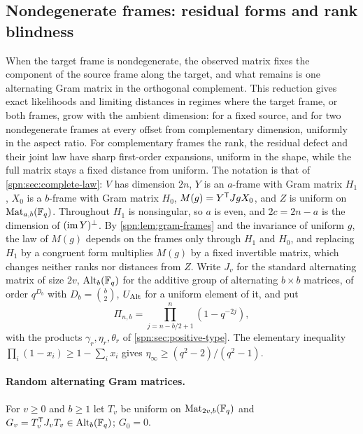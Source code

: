 
\subsection{Nondegenerate frames: residual forms and rank blindness}\label{spn:sec:nondegenerate}

When the target frame is nondegenerate, the observed matrix fixes the component of the source
frame along the target, and what remains is one alternating Gram matrix in the orthogonal
complement. This reduction gives exact likelihoods and limiting distances in regimes where the
target frame, or both frames, grow with the ambient dimension: for a fixed source, and for two
nondegenerate frames at every offset from complementary dimension, uniformly in the aspect
ratio. For complementary frames the rank, the residual defect and their joint law have sharp
first-order expansions, uniform in the shape, while the full matrix stays a fixed distance from
uniform. The notation is that of
\cref{spn:sec:complete-law}: $V$ has dimension $2n$, $Y$ is an $a$-frame with Gram matrix $H_1$,
$X_0$ is a $b$-frame with Gram matrix $H_0$, $M(g)=Y^{\mathsf{T}}JgX_0$, and $Z$ is uniform on
$\operatorname{Mat}_{a,b}(\mathbb{F}_q)$. Throughout $H_1$ is nonsingular, so $a$ is even, and $2c=2n-a$ is the
dimension of $(\operatorname{im} Y)^\perp$. By \cref{spn:lem:gram-frames} and the invariance of uniform $g$,
the law of $M(g)$ depends on the frames only through $H_1$ and $H_0$, and replacing $H_1$ by a
congruent form multiplies $M(g)$ by a fixed invertible matrix, which changes neither ranks nor
distances from $Z$. Write $J_v$ for the standard alternating matrix of size $2v$,
$\operatorname{Alt}_b(\mathbb{F}_q)$ for the additive group of alternating $b\times b$ matrices, of order
$q^{D_b}$ with $D_b=\binom b2$, $U_{\operatorname{Alt}}$ for a uniform element of it, and put
\[
 \Pi_{n,b}=\prod_{j=n-b/2+1}^{n}(1-q^{-2j}),
\]
with the products $\gamma_r,\eta_r,\theta_r$ of \cref{spn:sec:positive-type}. The elementary
inequality $\prod_i(1-x_i)\ge1-\sum_ix_i$ gives
$\eta_\infty\ge(q^2-2)/(q^2-1)$.

\paragraph{Random alternating Gram matrices.}
For $v\ge0$ and $b\ge1$ let $T_v$ be uniform on $\operatorname{Mat}_{2v,b}(\mathbb{F}_q)$ and
$G_v=T_v^{\mathsf{T}}J_vT_v\in\operatorname{Alt}_b(\mathbb{F}_q)$; $G_0=0$.

